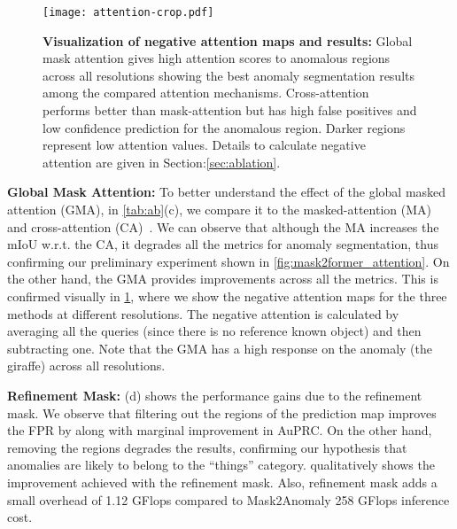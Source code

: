 \documentclass[10pt,twocolumn,letterpaper]{article}
\newcommand{\myparagraph}[1]{\vspace{3pt}\noindent\textbf{#1}}
\begin{document}
\begin{figure}[t]
\begin{center}
\texttt{[image: attention-crop.pdf]}
\end{center} \vspace{-1em}
 \caption{\textbf{Visualization of negative attention maps and results:} Global mask attention gives high attention scores to anomalous regions across all resolutions showing the best anomaly segmentation results among the compared attention mechanisms. Cross-attention performs better than mask-attention but has high false positives and low confidence prediction for the anomalous region. Darker regions represent low attention values. Details to calculate negative attention are given in Section:\ref{sec:ablation}.}
\label{fig:attention}
\end{figure}
\myparagraph{Global Mask Attention:} To better understand the effect of the global masked attention (GMA), in \cref{tab:ab}(c), we compare it to the masked-attention (MA)~\cite{cheng2022masked} and cross-attention (CA)~\cite{vaswani2017attention}. We can observe that although the MA increases the mIoU w.r.t. the CA, it degrades all the metrics for anomaly segmentation, thus confirming our preliminary experiment shown in \cref{fig:mask2former_attention}. On the other hand, the GMA provides improvements across all the metrics.
This is confirmed visually in \cref{fig:attention}, where we show the negative attention maps for the three methods at different resolutions.
The negative attention is calculated by averaging all the queries (since there is no reference known object) and then subtracting one. Note that the GMA has a high response on the anomaly (the giraffe) across all resolutions.


\myparagraph{Refinement Mask:} (d) shows the performance gains due to the refinement mask. We observe that filtering out the  regions of the prediction map improves the FPR by  along with marginal improvement in AuPRC. On the other hand, removing the  regions degrades the results, confirming our hypothesis that anomalies are likely to belong to the ``things'' category.  qualitatively shows the improvement achieved with the refinement mask. Also, refinement mask adds a small overhead of 1.12 GFlops compared to Mask2Anomaly 258 GFlops inference cost.
\end{document}
